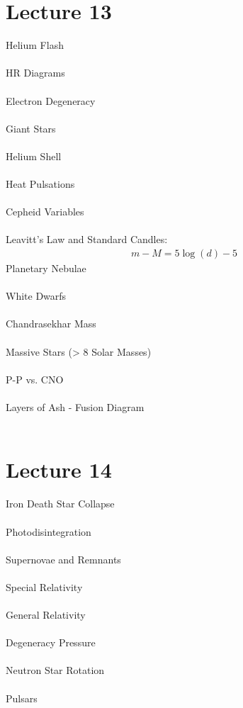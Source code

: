 \documentclass[11pt,reqno]{article}
\theoremstyle{definition}
\begin{document}
\section*{Lecture 13}
Helium Flash\\\\
HR Diagrams\\\\
Electron Degeneracy\\\\
Giant Stars\\\\
Helium Shell\\\\
Heat Pulsations\\\\
Cepheid Variables\\\\
Leavitt's Law and Standard Candles:
\begin{align*}
    m - M = 5\log(d) - 5
\end{align*}
Planetary Nebulae\\\\
White Dwarfs\\\\
Chandrasekhar Mass\\\\
Massive Stars (> 8 Solar Masses)\\\\
P-P vs. CNO\\\\
Layers of Ash - Fusion Diagram\\\\

\section*{Lecture 14}
Iron Death Star Collapse\\\\
Photodisintegration\\\\
Supernovae and Remnants\\\\
Special Relativity\\\\
General Relativity\\\\
Degeneracy Pressure\\\\
Neutron Star Rotation\\\\
Pulsars\\\\
\end{document}
